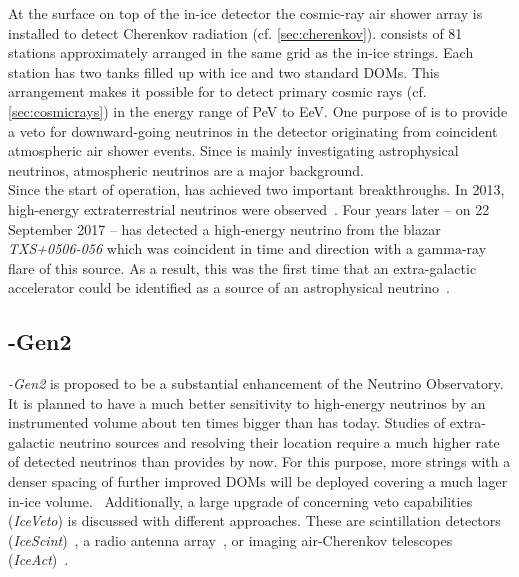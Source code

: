 At the surface on top of the in-ice detector the cosmic-ray air shower array \icetop is installed to detect Cherenkov radiation (cf. \ref{sec:cherenkov}). \icetop consists of 81 stations approximately arranged in the same grid as the in-ice strings. Each station has two tanks filled up with ice and two standard \icecube DOMs. This arrangement makes it possible for \icetop to detect primary cosmic rays (cf. \ref{sec:cosmicrays}) in the energy range of \si{\peta\electronvolt} to \si{\exa\electronvolt}. One purpose of \icetop is to provide a veto for downward-going neutrinos in the \icecube detector originating from coincident atmospheric air shower events. \cite{icecube:instrumentation} Since \icecube is mainly investigating astrophysical neutrinos, atmospheric neutrinos are a major background.\\

Since the start of operation, \icecube has achieved two important breakthroughs. In 2013, high-energy extraterrestrial neutrinos were observed~\cite{icecube:he_neutrino}. Four years later -- on \num{22} September 2017 -- \icecube has detected a high-energy neutrino from the blazar \textit{TXS+0506-056} which was coincident in time and direction with a gamma-ray flare of this source. As a result, this was the first time that an extra-galactic accelerator could be identified as a source of an astrophysical neutrino~\cite{icecube:txs}.

\subsection{\icecube-Gen2}

\textit{\icecube-Gen2} is proposed to be a substantial enhancement of the \icecube Neutrino Observatory. It is planned to have a much better sensitivity to high-energy neutrinos by an instrumented volume about ten times bigger than \icecube has today. Studies of extra-galactic neutrino sources and resolving their location require a much higher rate of detected neutrinos than \icecube provides by now. For this purpose, more strings with a denser spacing of further improved DOMs will be deployed covering a much lager in-ice volume.~\cite{icecube:iceact,icecube:gen2} Additionally, a large upgrade of \icetop concerning veto capabilities (\textit{IceVeto}) is discussed with different approaches. These are scintillation detectors (\textit{IceScint})~\cite{icecube:gen2:icescint}, a radio antenna array~\cite{icecube:gen2:radio}, or imaging air-Cherenkov telescopes (\textit{IceAct})~\cite{iacts:extension,icecube:iceact}.

